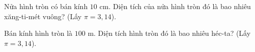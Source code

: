 \begin{ex}
  Nửa hình tròn có bán kính $10\text{ cm}$. Diện tích của nửa hình tròn đó là bao nhiêu xăng-ti-mét vuông? (Lấy $\pi = 3{,}14$).
\end{ex}

\begin{ex}
  Bán kính hình tròn là $100\text{ m}$. Diện tích hình tròn đó là bao nhiêu héc-ta? (Lấy $\pi = 3{,}14$).
\end{ex}
